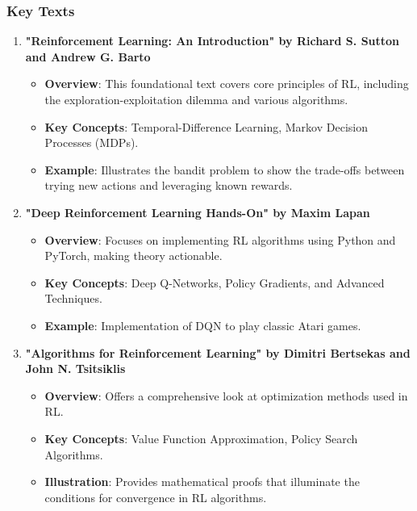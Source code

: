 \documentclass[aspectratio=169]{beamer}
\begin{document}
\begin{frame}[fragile]
    \frametitle{Key Texts}
    \begin{enumerate}
        \item \textbf{"Reinforcement Learning: An Introduction" by Richard S. Sutton and Andrew G. Barto}
        \begin{itemize}
            \item \textbf{Overview}: This foundational text covers core principles of RL, including the exploration-exploitation dilemma and various algorithms.
            \item \textbf{Key Concepts}: Temporal-Difference Learning, Markov Decision Processes (MDPs).
            \item \textbf{Example}: Illustrates the bandit problem to show the trade-offs between trying new actions and leveraging known rewards.
        \end{itemize}

        \item \textbf{"Deep Reinforcement Learning Hands-On" by Maxim Lapan}
        \begin{itemize}
            \item \textbf{Overview}: Focuses on implementing RL algorithms using Python and PyTorch, making theory actionable.
            \item \textbf{Key Concepts}: Deep Q-Networks, Policy Gradients, and Advanced Techniques.
            \item \textbf{Example}: Implementation of DQN to play classic Atari games.
        \end{itemize}

        \item \textbf{"Algorithms for Reinforcement Learning" by Dimitri Bertsekas and John N. Tsitsiklis}
        \begin{itemize}
            \item \textbf{Overview}: Offers a comprehensive look at optimization methods used in RL.
            \item \textbf{Key Concepts}: Value Function Approximation, Policy Search Algorithms.
            \item \textbf{Illustration}: Provides mathematical proofs that illuminate the conditions for convergence in RL algorithms.
        \end{itemize}
    \end{enumerate}
\end{frame}
\end{document}
